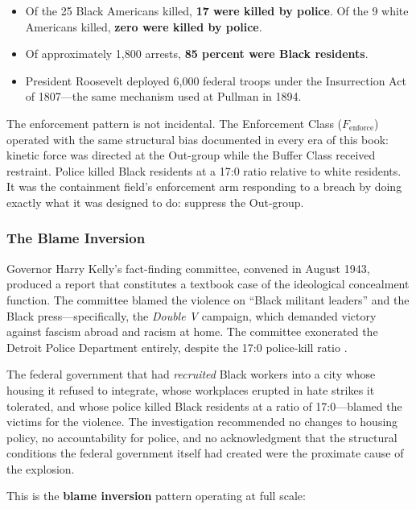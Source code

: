 \begin{itemize}
  \tightlist
  \item Of the 25 Black Americans killed, \textbf{17 were killed by police}. Of the 9 white Americans killed, \textbf{zero were killed by police}.
  \item Of approximately 1,800 arrests, \textbf{85 percent were Black residents}.
  \item President Roosevelt deployed 6,000 federal troops under the Insurrection Act of 1807---the same mechanism used at Pullman in 1894.
\end{itemize}

The enforcement pattern is not incidental. The Enforcement Class ($F_{\text{enforce}}$) operated with the same structural bias documented in every era of this book: kinetic force was directed at the Out-group while the Buffer Class received restraint. Police killed Black residents at a 17:0 ratio relative to white residents. It was the containment field's enforcement arm responding to a breach by doing exactly what it was designed to do: suppress the Out-group.

\subsubsection{The Blame Inversion}

Governor Harry Kelly's fact-finding committee, convened in August 1943, produced a report that constitutes a textbook case of the ideological concealment function. The committee blamed the violence on ``Black militant leaders'' and the Black press---specifically, the \textit{Double V} campaign, which demanded victory against fascism abroad and racism at home. The committee exonerated the Detroit Police Department entirely, despite the 17:0 police-kill ratio \cite{capeci_detroit}.

The federal government that had \textit{recruited} Black workers into a city whose housing it refused to integrate, whose workplaces erupted in hate strikes it tolerated, and whose police killed Black residents at a ratio of 17:0---blamed the victims for the violence. The investigation recommended no changes to housing policy, no accountability for police, and no acknowledgment that the structural conditions the federal government itself had created were the proximate cause of the explosion.

This is the \textbf{blame inversion} pattern operating at full scale:

